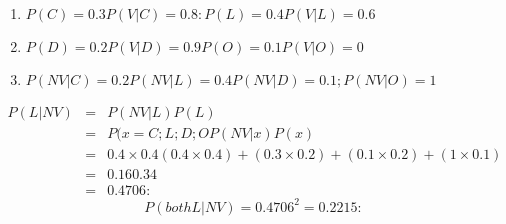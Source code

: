 \documentclass[a4paper,12pt]{article}
\begin{document}
\begin{enumerate}
\begin{enumerate}
    \item $P(C) = 0.3 P(V |C) = 0.8: P(L) = 0.4 P(V | L) = 0.6$
    \item $P(D) = 0.2 P(V |D) = 0.9 P(O) = 0.1 P(V |O) = 0$
    \item $P(NV |C) = 0.2 P(NV |L) = 0.4 P(NV |D) = 0.1; P(NV |O) = 1$
\end{enumerate}
\begin{eqnarray*}
P(L|NV ) &=& P(NV |L)P(L)\\ 
&=&
P(x=C;L;D;OP(NV |x)P(x)\\
&=& 0.4\times 0.4
(0.4\times 0.4)+(0.3\times 0.2)+(0.1\times 0.2)+(1\times 0.1)\\ &=& 0.16
0.34 \\ &=& 0.4706:
\end{eqnarray*}
\[P(both L|NV ) = 0.4706^2 = 0.2215:\]

\end{enumerate}
\end{document}
